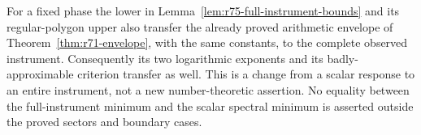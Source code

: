 For a fixed phase the lower in Lemma~\ref{lem:r75-full-instrument-bounds}
and its regular-polygon upper also transfer the already proved arithmetic
envelope of Theorem~\ref{thm:r71-envelope}, with the same constants, to
the complete observed instrument.  Consequently its two logarithmic
exponents and its badly-approximable criterion transfer as well.  This is
a change from a scalar response to an entire instrument, not a new
number-theoretic assertion.  No equality between the full-instrument
minimum and the scalar spectral minimum is asserted outside the proved
sectors and boundary cases.
